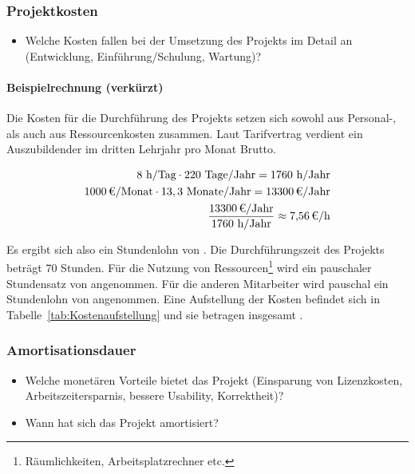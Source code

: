\subsubsection{Projektkosten}
\label{sec:Projektkosten}
\begin{itemize}
	\item Welche Kosten fallen bei der Umsetzung des Projekts im Detail an (\zB Entwicklung, Einführung/Schulung, Wartung)?
\end{itemize}

\paragraph{Beispielrechnung (verkürzt)}
Die Kosten für die Durchführung des Projekts setzen sich sowohl aus Personal-, als auch aus Ressourcenkosten zusammen.
Laut Tarifvertrag verdient ein Auszubildender im dritten Lehrjahr pro Monat  Brutto. 

\begin{eqnarray}
8 \mbox{ h/Tag} \cdot 220 \mbox{ Tage/Jahr} = 1760 \mbox{ h/Jahr}\\
\eur{1000}\mbox{/Monat} \cdot 13,3 \mbox{ Monate/Jahr} = \eur{13300} \mbox{/Jahr}\\
\frac{\eur{13300} \mbox{/Jahr}}{1760 \mbox{ h/Jahr}} \approx \eur{7,56}\mbox{/h}
\end{eqnarray}

Es ergibt sich also ein Stundenlohn von . 
Die Durchführungszeit des Projekts beträgt 70 Stunden. Für die Nutzung von Ressourcen\footnote{Räumlichkeiten, Arbeitsplatzrechner etc.} wird 
ein pauschaler Stundensatz von  angenommen. Für die anderen Mitarbeiter wird pauschal ein Stundenlohn von  angenommen. 
Eine Aufstellung der Kosten befindet sich in Tabelle~\ref{tab:Kostenaufstellung} und sie betragen insgesamt .


\subsubsection{Amortisationsdauer}
\label{sec:Amortisationsdauer}
\begin{itemize}
	\item Welche monetären Vorteile bietet das Projekt (\zB Einsparung von Lizenzkosten, Arbeitszeitersparnis, bessere Usability, Korrektheit)?
	\item Wann hat sich das Projekt amortisiert?
\end{itemize}

